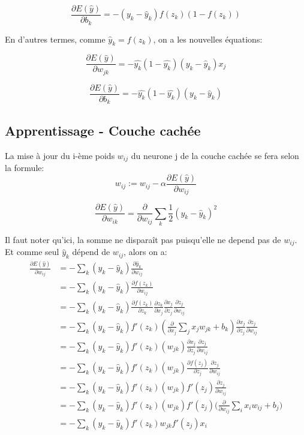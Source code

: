 \documentclass{article}
\begin{document}
$$\frac{\partial{E(\hat{y})}}{\partial{b_k}}=-(y_k-\hat{y}_k)f(z_k)(1-f(z_k))$$

En d'autres termes, comme $\hat{y}_k=f(z_k)$, on a les nouvelles équations:

$$\frac{\partial{E(\hat{y})}}{\partial{w_{jk}}}=-\hat{y_k}(1-\hat{y_k})(y_k-\hat{y}_k)x_j$$

$$\frac{\partial{E(\hat{y})}}{\partial{b_k}}=-\hat{y_k}(1-\hat{y_k})(y_k-\hat{y}_k)$$


\subsection{Apprentissage - Couche cachée}

La mise à jour du i-ème poids $w_{ij}$ du neurone j de la couche cachée se fera selon la formule: 
\begin{equation}
w_{ij}:=w_{ij}-\alpha\frac{\partial{E(\hat{y})}}{\partial{w_{ij}}}
\end{equation}

\begin{equation}
\frac{\partial{E(\hat{y})}}{\partial{w_{ik}}}=\frac{\partial{}}{\partial{w_{ij}}}\sum_k{\frac{1}{2}(y_k-\hat{y}_k)^2}
\end{equation}

Il faut noter qu'ici, la somme ne disparaît pas puisqu'elle ne depend pas de $w_{ij}$. Et comme seul $\hat{y}_k$ dépend de $w_{ij}$, alors on a:
\begin{equation}
\begin{split}
\frac{\partial{E(\hat{y})}}{\partial{w_{ij}}}&=-\sum_k{(y_k-\hat{y}_k)\frac{\partial{\hat{y}_k}}{\partial{w_{ij}}}}\\
&=-\sum_k{(y_k-\hat{y}_k)\frac{\partial{f(z_k)}}{\partial{w_{ij}}}}\\
&=-\sum_k{(y_k-\hat{y}_k)\frac{\partial{f(z_k)}}{\partial{z_k}}\frac{\partial{z_k}}{\partial{x_j}}\frac{\partial{x_j}}{\partial{z_j}}\frac{\partial{z_j}}{\partial{w_{ij}}}}\\
&=-\sum_k{(y_k-\hat{y}_k){f'(z_k)}(\frac{\partial{}}{\partial{x_j}}\sum_j{{x_j}w_{jk}}+b_k)\frac{\partial{x_j}}{\partial{z_j}}\frac{\partial{z_j}}{\partial{w_{ij}}}}\\
&=-\sum_k{(y_k-\hat{y}_k){f'(z_k)}(w_{jk})\frac{\partial{x_j}}{\partial{z_j}}\frac{\partial{z_j}}{\partial{w_{ij}}}}\\
&=-\sum_k{(y_k-\hat{y}_k){f'(z_k)}(w_{jk})\frac{\partial{f(z_j)}}{\partial{z_j}}\frac{\partial{z_j}}{\partial{w_{ij}}}}\\
&=-\sum_k{(y_k-\hat{y}_k){f'(z_k)}(w_{jk}){f'(z_j)}\frac{\partial{z_j}}{\partial{w_{ij}}}}\\
&=-\sum_k{(y_k-\hat{y}_k){f'(z_k)}(w_{jk}){f'(z_j)}(\frac{\partial{}}{\partial{w_{ij}}}}\sum_i{{x_i}w_{ij}}+b_j)\\
&=-\sum_k{(y_k-\hat{y}_k){f'(z_k)}w_{jk}{f'(z_j)}x_i}
\end{split}
\end{equation}
\end{document}
